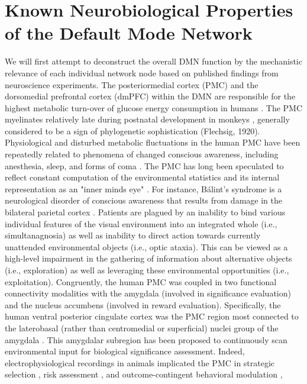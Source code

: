 \documentclass{article} %
\begin{document}
\section{Known Neurobiological Properties of the Default Mode Network}
We will first attempt to deconstruct the overall DMN function
by the mechanistic relevance of each individual network node
based on published findings from neuroscience experiments.
%
The posteriormedial cortex (PMC) and
the dorsomedial prefrontal cortex (dmPFC) within the DMN
are responsible for the highest metabolic turn-over
of glucose energy consumption in humans \citep{raichle2001pnas}.
The PMC myelinates relatively late during postnatal development in monkeys
\citep{goldman1987development}, generally considered to
be a sign of phylogenetic sophistication (Flechsig, 1920).
Physiological and disturbed metabolic fluctuations in the
human PMC have been repeatedly related to
phenomena of changed conscious awareness,
including anesthesia,
sleep, and forms of coma \citep{cavanna2006precuneus}.
%
The PMC has long been speculated to reflect constant computation of
the environmental statistics and its internal representation
as an "inner minds eye" \citep{cavanna2006precuneus}.
For instance, B\'alint's syndrome is a neurological disorder of conscious
awareness that results from damage in the bilateral parietal cortex
\citep{balint1909seelenlahmung}.
Patients are plagued by an
inability to bind various individual features of the visual
environment into an integrated whole (i.e., simultanagnosia)
as well as inability to direct action towards
currently unattended environmental objects
(i.e., optic ataxia).
This can be viewed as a high-level impairment in the gathering
of information about alternative objects (i.e., exploration) as well as
leveraging these environmental opportunities (i.e., exploitation).
Congruently,
the human PMC was coupled in two functional connectivity modalities
with the amygdala
(involved in significance evaluation) and
the nucleus accumbens (involved in reward evaluation).
Specifically, the human ventral posterior cingulate cortex was
the PMC region most connected to the laterobasal
(rather than centromedial or superficial) nuclei group
of the amygdala \citep{bzdok2015subspecialization}.
This amygdalar subregion has been proposed to
continuously scan environmental input
for biological significance assessment.
%
Indeed,
electrophysiological recordings in animals implicated the PMC in
strategic selection \citep{pearson2009neurons},
risk assessment \citep{mccoy2005risk},
and outcome-contingent behavioral modulation \citep{hayden2009electrophysiological},
\end{document}
